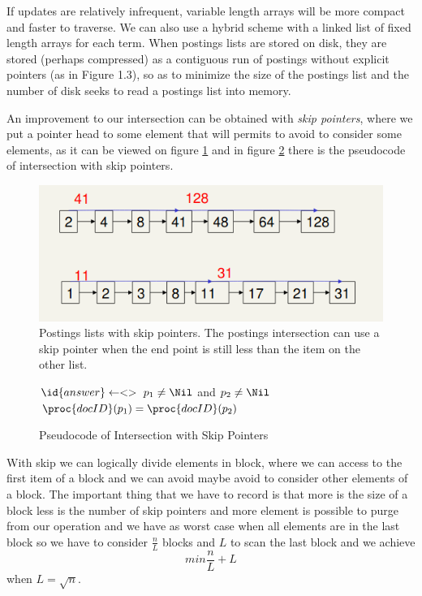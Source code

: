 If updates are relatively infrequent, variable
length arrays will be more compact and faster to traverse. We can also use a
hybrid scheme with a linked list of fixed length arrays for each term. When
postings lists are stored on disk, they are stored (perhaps compressed) as a
contiguous run of postings without explicit pointers (as in Figure 1.3), so as
to minimize the size of the postings list and the number of disk seeks to read
a postings list into memory.

An improvement to our intersection can be obtained with \emph{skip pointers}, where we put a pointer 
head to some element that will permits to avoid to consider some elements, as it can be viewed on 
figure \ref{img:skip} and in figure \ref{alg:skip} there is the pseudocode of intersection with skip pointers.


\begin{figure}
    \caption{Postings lists with skip pointers. The postings intersection can use a skip pointer
             when the end point is still less than the item on the other list.}
    \label{img:skip}
    \includegraphics[width=\textwidth]{Images/skip}
\end{figure}

\begin{figure}
    \caption{Pseudocode of Intersection with Skip Pointers}
    \label{alg:skip}
    \begin{codebox}
	\li $\id{answer} \gets <>$
	\li \While $p_1 \neq \Nil$ and $p_2 \neq \Nil$
	    \Do
	\li        \If $\proc{docID}(p_1) = \proc{docID}(p_2)$
	    	   \Then
	\li 	          
    \end{codebox}
\end{figure}
With skip we can logically divide elements in block, where we can access to the first item of a block and we 
can avoid maybe avoid to consider other elements of a block.\newline
The important thing that we have to record is that more is the size of a block less is the number of skip pointers 
and more element is possible to purge from our operation and we have as worst case when all elements are 
in the last block so we have to consider $\frac{n}{L}$ blocks and $L$ to scan the last block and we achieve 
\[ min \frac{n}{L} + L \]
when $L = \sqrt{n}$.

